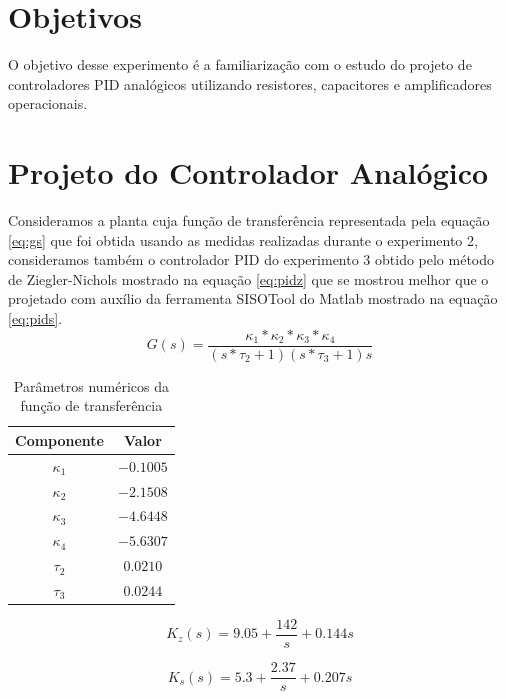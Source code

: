 \documentclass{article}
\begin{document}


\onehalfspacing
\section{Objetivos} 
O objetivo desse experimento é a familiarização com o estudo do projeto de controladores PID analógicos utilizando resistores, capacitores e amplificadores operacionais. 
	
\section{Projeto do Controlador Analógico}
Consideramos a planta cuja função de transferência representada pela equação \ref{eq:gs} que foi obtida usando as medidas realizadas durante o experimento 2, consideramos também o controlador PID do experimento 3 obtido pelo método de Ziegler-Nichols mostrado na equação \ref{eq:pidz} que se mostrou melhor que o projetado com auxílio da ferramenta SISOTool do Matlab mostrado na equação \ref{eq:pids}.\\

\begin{equation}
\label{eq:gs}
G(s) = \frac{\kappa_1*\kappa_2*\kappa_3*\kappa_4}{(s*\tau_2 + 1)(s*\tau_3 + 1)s}
\end{equation}

\begin{table}[H]
\centering
\caption{Parâmetros numéricos da função de transferência}
\label{tab:valores}
\begin{tabular}{|c|c|}
	\hline Componente & Valor \\ 
	\hline $\kappa_1$ & $-0.1005$\\ 
	\hline $\kappa_2$ & $-2.1508$\\ 
	\hline $\kappa_3$ & $-4.6448$\\ 
	\hline $\kappa_4$ & $-5.6307$\\ 
	\hline $\tau_2$ & $0.0210$\\ 
	\hline $\tau_3$ & $0.0244$ \\ 	
	\hline 
\end{tabular} 
\end{table}

\begin{equation}
\label{eq:pidz}
K_z(s) = 9.05+\frac{142}{s}+0.144 s
\end{equation}

\begin{equation}
\label{eq:pids}
K_s(s) = 5.3+\frac{2.37}{s}+0.207 s
\end{equation}
\end{document}
